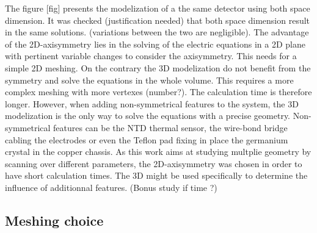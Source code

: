 The figure [fig] presents the modelization of a the same detector using both space dimension. It was checked (justification needed) that both space dimension result in the same solutions. (variations between the two are negligible). The advantage of the 2D-axisymmetry lies in the solving of the electric equations in a 2D plane with pertinent variable changes to consider the axisymmetry. This needs for a simple 2D meshing. On the contrary the 3D modelization do not benefit from the symmetry and solve the equations in the whole volume. This requires a more complex meshing with more vertexes (number?). The calculation time is therefore longer. However, when adding non-symmetrical features to the system, the 3D modelization is the only way to solve the equations with a precise geometry. Non-symmetrical features can be the NTD thermal sensor, the wire-bond bridge cabling the electrodes or even the Teflon pad fixing in place the germanium crystal in the copper chassis.
As this work aims at studying multplie geometry by scanning over different parameters, the 2D-axisymmetry was chosen in order to have short calculation times. The 3D might be used specifically to determine the influence of additionnal features. (Bonus study if time ?)


\subsection{Meshing choice}
\label{par:mesh-scale}

